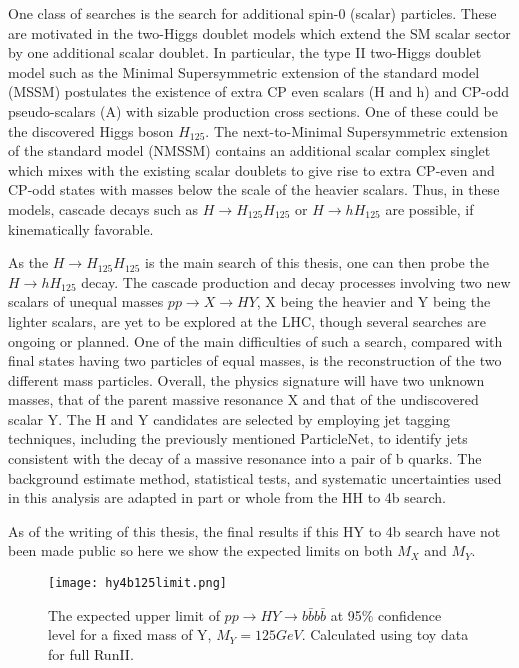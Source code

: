 One class of searches is the search for additional spin-0 (scalar) particles. These are motivated in the two-Higgs doublet models which extend the SM scalar sector by one additional scalar doublet. 
In particular, the type II two-Higgs doublet model such as the Minimal Supersymmetric extension of the standard model (MSSM) postulates the existence of extra CP even scalars (H and h) and CP-odd pseudo-scalars (A) with sizable production cross sections. 
One of these could be the discovered Higgs boson $H_{125}$. The next-to-Minimal Supersymmetric extension of the standard model (NMSSM) contains an additional scalar complex singlet which mixes with the existing scalar doublets to give rise to extra CP-even and CP-odd states with masses below the scale of the heavier scalars. 
Thus, in these models, cascade decays such as $H \rightarrow H_{125}H_{125}$ or $H \rightarrow hH_{125}$ are possible, if kinematically favorable.

As the $H \rightarrow H_{125}H_{125}$ is the main search of this thesis, one can then probe the $H \rightarrow hH_{125}$ decay.
The cascade production and decay processes involving two new scalars of unequal masses $pp \rightarrow X \rightarrow HY$, X being the heavier and Y being the lighter scalars, are yet to be explored at the LHC, though several searches are ongoing or planned. 
One of the main difficulties of such a search, compared with final states having two particles of equal masses, is the reconstruction of the two different mass particles. 
Overall, the physics signature will have two unknown masses, that of the parent massive resonance X and that of the undiscovered scalar Y.
The H and Y candidates are selected by employing jet tagging techniques, including the previously mentioned ParticleNet, to identify jets consistent with the decay of a massive resonance into a pair of b quarks.
The background estimate method, statistical tests, and systematic uncertainties used in this analysis are adapted in part or whole from the HH to 4b search.

As of the writing of this thesis, the final results if this HY to 4b search have not been made public so here we show the expected limits on both $M_X$ and $M_Y$.

\begin{figure} %
    \centering
    \texttt{[image: hy4b125limit.png]}
    \caption{The expected upper limit of $pp \rightarrow HY \rightarrow b\bar{b} b\bar{b}$ at 95\% confidence level for a fixed mass of Y, $M_Y = 125 GeV$. Calculated using toy data for full RunII.}
    \label{fig:hy4b125limit}
 \end{figure}

